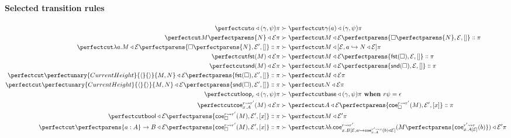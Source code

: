 \documentclass{article}
\newcommand\Clo[2]{#1\triangleleft{#2}}
\newcommand\Coe[4]{\mathsf{coe}^{#1\leadsto{#2}}_{#3} (#4)}
\newcommand\DFun[3]{\perfectparens{#1:#2}\to{#3}}
\newcommand\Lam[2]{\lambda{#1}.{#2}}
\newcommand\Fst[1]{\mathsf{fst} (#1)}
\newcommand\Snd[1]{\mathsf{snd} (#1)}
\newcommand\Loop[1]{\mathsf{loop}_{#1}}
\newcommand\Base{\mathsf{base}}
\newcommand\Cons[2]{{#1}\dblcolon{#2}}
\newcommand\AStep[2]{{#1}&\succ{#2}}
\newcommand\Bool{\mathsf{bool}}
\newcommand\Frame[3]{\perfectparens{#1,#2,#3}}
\newcommand\Cfg[3]{\cut{\Clo{#1}{#2}}{#3}}
\newcommand\App[2]{{#1}\perfectparens{#2}}
\newcommand\Pair[2]{\perfectunary{CurrentHeight}{\langle}{\rangle}{#1,#2}}
\begin{document}
\paragraph{Selected transition rules}
\begin{align}
  \AStep{
    \Cfg{a}{(\gamma,\psi)}{\pi}
  }{
    \Cfg{\gamma(a)}{(\gamma,\psi)}{\pi}
  }
  \\
  \AStep{
    \Cfg{\App{M}{N}}{\mathcal{E}}{\pi}
  }{
    \Cfg{M}{\mathcal{E}}{\Cons{\Frame{\App{\Box}{N}}{\mathcal{E}}{[]}}{\pi}}
  }
  \\
  \AStep{
    \Cfg{\Lam{a}{M}}{\mathcal{E}}{\Cons{\Frame{\App{\Box}{N}}{\mathcal{E}'}{[]}}{\pi}}
  }{
    \Cfg{M}{[\mathcal{E},a\hookrightarrow{\Clo{N}{\mathcal{E}}}]}{\pi}
  }
  \\
  \AStep{
    \Cfg{\Fst{M}}{\mathcal{E}}{\pi}
  }{
    \Cfg{M}{\mathcal{E}}{\Cons{\Frame{\Fst{\Box}}{\mathcal{E}}{[]}}{\pi}}
  }
  \\
  \AStep{
    \Cfg{\Snd{M}}{\mathcal{E}}{\pi}
  }{
    \Cfg{M}{\mathcal{E}}{\Cons{\Frame{\Snd{\Box}}{\mathcal{E}}{[]}}{\pi}}
  }
  \\
  \AStep{
    \Cfg{\Pair{M}{N}}{\mathcal{E}}{\Cons{\Frame{\Fst{\Box}}{\mathcal{E}'}{[]}}{\pi}}
  }{
    \Cfg{M}{\mathcal{E}}{\pi}
  }
  \\
  \AStep{
    \Cfg{\Pair{M}{N}}{\mathcal{E}}{\Cons{\Frame{\Snd{\Box}}{\mathcal{E}'}{[]}}{\pi}}
  }{
    \Cfg{N}{\mathcal{E}}{\pi}
  }
  \\
  \AStep{
    \Cfg{\Loop{r}}{(\gamma,\psi)}{\pi}
  }{
    \Cfg{\Base}{(\gamma,\psi)}{\pi}
  }
  \textbf{ when } r\psi = \epsilon
  \\
  \AStep{
    \Cfg{\Coe{r}{r'}{x.A}{M}}{\mathcal{E}}{\pi}
  }{
    \Cfg{A}{\mathcal{E}}{
      \Cons{
        \Frame{\Coe{r}{r'}{\Box}{M}}{\mathcal{E}'}{[x]}
      }{\pi}
    }
  }
  \\
  \AStep{
    \Cfg{\Bool}{\mathcal{E}}{
      \Cons{\Frame{\Coe{r}{r'}{\Box}{M}}{\mathcal{E}'}{[x]}}{\pi}
    }
  }{
    \Cfg{M}{\mathcal{E}'}{\pi}
  }
  \\
  \AStep{
    \Cfg{
      \DFun{a}{A}{B}
    }{
      \mathcal{E}
    }{
      \Cons{\Frame{\Coe{r}{r'}{\Box}{M}}{\mathcal{E}'}{[x]}}{\pi}
    }
  }{
    \Cfg{
      \Lam{b}{
        \Coe{r}{r'}{
          x.B[\mathcal{E},a\hookrightarrow \Clo{\Coe{r'}{x}{x.A}{b}}{\mathcal{E}}]
        }{
          \App{M}{
            \Coe{r'}{r}{x. A[\mathcal{E}]}{b}
          }
        }
      }
    }{
      \mathcal{E}'
    }{
      \pi
    }
  }
\end{align}
\end{document}
